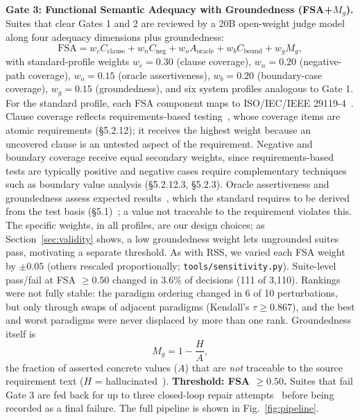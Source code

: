 \documentclass[conference]{IEEEtran}
\begin{document}
\textbf{Gate 3: Functional Semantic Adequacy with Groundedness (FSA+$M_g$).}
Suites that clear Gates 1 and 2 are reviewed by a 20B open-weight judge model along four
adequacy dimensions plus groundedness:
\begin{equation}
\mathrm{FSA} = w_c C_{\text{clause}} + w_n C_{\text{neg}} + w_o A_{\text{oracle}} + w_b C_{\text{bound}} + w_g M_g,
\end{equation}
with standard-profile weights $w_c=0.30$ (clause coverage), $w_n=0.20$
(negative-path coverage), $w_o=0.15$ (oracle assertiveness), $w_b=0.20$
(boundary-case coverage), $w_g=0.15$ (groundedness), and six system profiles
analogous to Gate 1. For the standard profile, each FSA component maps to ISO/IEC/IEEE 29119-4~\cite{iso29119_4}. Clause coverage reflects requirements-based testing~\cite{whalen2006requirements}, whose coverage items are atomic requirements (\S5.2.12); it receives the highest weight because an uncovered clause is an untested aspect of the requirement. Negative and boundary coverage receive equal secondary weights, since requirements-based tests are typically positive and negative cases require complementary techniques such as boundary value analysis (\S5.2.12.3, \S5.2.3). Oracle assertiveness and groundedness assess expected results~\cite{barr2015oracle}, which the standard requires to be derived from the test basis (\S5.1)~\cite{iso29119}; a value not traceable to the requirement violates this. The specific weights, in all profiles, are our design choices; as Section~\ref{sec:validity} shows, a low groundedness weight lets ungrounded suites pass, motivating a separate threshold. As with RSS, we varied each FSA weight by
$\pm0.05$ (others rescaled proportionally; \texttt{tools/sensitivity.py}).
Suite-level pass/fail at FSA $\geq 0.50$ changed in 3.6\% of decisions
(111 of 3{,}110). Rankings were not fully stable: the paradigm ordering changed
in 6 of 10 perturbations, but only through swaps of adjacent paradigms
(Kendall's $\tau\geq0.867$), and the best and worst paradigms were never displaced
by more than one rank. Groundedness itself is
\begin{equation}
M_g = 1 - \frac{H}{A},
\end{equation}
the fraction of asserted concrete values ($A$) that are \emph{not} traceable
to the source requirement text ($H$ = hallucinated~\cite{ji2023hallucination}). \textbf{Threshold: FSA
$\geq 0.50$.} Suites that fail Gate 3 are fed back for up to three
closed-loop repair attempts~\cite{shinn2023reflexion} before being recorded as a final failure. The
full pipeline is shown in Fig.~\ref{fig:pipeline}.
\end{document}

